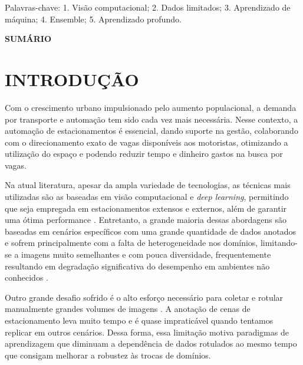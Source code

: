 \documentclass{article}
\makeatletter
\renewcommand{\tableofcontents}{%
    \@starttoc{toc}%
}
\makeatother
\begin{document}
Palavras-chave: 1. Visão computacional; 2. Dados limitados; 3. Aprendizado de máquina; 4. Ensemble; 5. Aprendizado profundo.

\newpage


\newpage
\begin{center}
    \textbf{SUMÁRIO}
\end{center}

\tableofcontents 
\newpage

\setcounter{section}{0}

\section{INTRODUÇÃO}\label{sec:introducao}
Com o crescimento urbano impulsionado pelo aumento populacional, a demanda por transporte e automação tem sido cada vez mais necessária. Nesse contexto, a automação de estacionamentos é essencial, dando suporte na gestão, colaborando com o direcionamento exato de vagas disponíveis aos motoristas, otimizando a utilização do espaço e podendo reduzir tempo e dinheiro gastos na busca por vagas\cite{bhattacharya2022review}. 

Na atual literatura, apesar da ampla variedade de tecnologias, as técnicas mais utilizadas são as baseadas em visão computacional e \textit{deep learning}, permitindo que seja empregada em estacionamentos extensos e externos, além de garantir uma ótima performance \cite{Almeida2022, Almeida2023Vehicle}. Entretanto, a grande maioria dessas abordagens são baseadas em cenários específicos com uma grande quantidade de dados anotados e sofrem principalmente com a falta de heterogeneidade nos domínios, limitando-se a imagens muito semelhantes e com pouca diversidade, frequentemente resultando em degradação significativa do desempenho em ambientes não conhecidos \cite{hochuli2023,Luza2025PKLOTDISTILLING}. 

Outro grande desafio sofrido é o alto esforço necessário para coletar e rotular manualmente grandes volumes de imagens \cite{hochuli2022}. A anotação de cenas de estacionamento leva muito tempo e é quase impraticável quando tentamos replicar em outros cenários. Dessa forma, essa limitação motiva paradigmas de aprendizagem que diminuam a dependência de dados rotulados ao mesmo tempo que consigam melhorar a robustez às trocas de domínios. 
\end{document}
